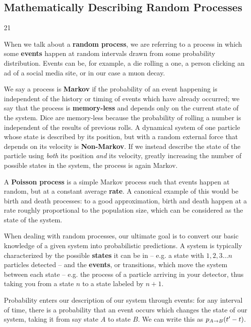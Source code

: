 \documentclass[aps,prb,groupedaddress,notitlepage,nofootinbib]{revtex4-1} %
\begin{document}
\subsection{Mathematically Describing Random Processes}
\vspace{-1cm}
\begin{wblurb}{21}
{
  When  we talk about a \textbf{random process}, we are referring to a process in which some \textbf{events} happen at random intervals drawn from some probability distribution. Events can be, for example, a die rolling a one, a person clicking an ad of a social media site, or in our case a muon decay. 

\medskip
We say a process is \textbf{Markov} if the probability of an event happening is independent of the history or timing of events which have already occurred; we say that the process is \textbf{memory-less} and depends only on the current state of the system. Dice are memory-less because the probability of rolling a number is independent of the results of previous rolls. A dynamical system of one particle whose state is described by its position, but with a random external force that depends on its velocity is \textbf{Non-Markov}. If we instead describe the state of the particle using \textit{both} its position \textit{and} its velocity, greatly increasing the number of possible states in the system, the process is again Markov.
\medskip 

A \textbf{Poisson process} is a simple Markov process such that events happen at random, but at a constant average \textbf{rate}. A canonical example of this would be birth and death processes: to a good approximation, birth and death happen at a rate roughly proportional to the population size, which can be considered as the state of the system.}
\end{wblurb}
\vspace{1cm}

When dealing with random processes, our ultimate goal is to convert our basic knowledge of a given system into probabilistic predictions. A system is typically characterized by the possible \textbf{states} it can be in -- e.g. a state with $1, 2, 3 \dots n$ particles detected -- and the \textbf{events}, or transitions, which move the system between each state -- e.g. the process of a particle arriving in your detector, thus taking you from a state $n$ to a state labeled by $n+1$. 

Probability enters our description of our system through events: for any interval of time, there is a probability that an event occurs which changes the state of our system, taking it from say state $A$ to state $B$. We can write this as $p_{A \rightarrow B}(t'-t)$. 
\end{document}
